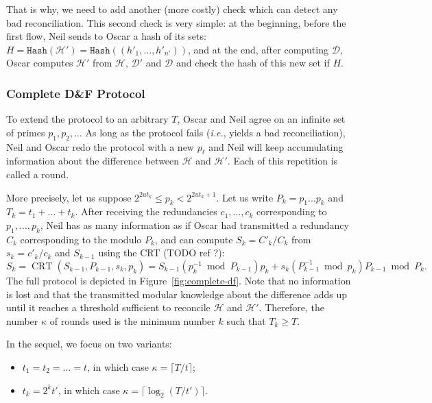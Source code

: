 \documentclass[11pt]{llncs}
\newcommand{\Set}{\mathcal{H}}
\newcommand{\SetD}{\mathcal{D}}
\newcommand{\df}{D\&F\xspace}
\newcommand{\ie}{\textit{i.e.}\xspace}
\newcommand{\Hash}{\ensuremath{\mathtt{Hash}}}
\DeclareMathOperator{\CRT}{CRT}
\begin{document}
That is why, we need to add another (more costly) check which can detect any bad reconciliation.
This second check is very simple: at the beginning, before the first flow, Neil sends to Oscar a hash of its sets: $H = \Hash(\Set') = \Hash((h'_1,\dots,h'_{n'}))$, and at the end, after computing $\SetD$, Oscar computes $\Set'$ from $\Set$, $\SetD'$ and $\SetD$ and check the hash of this new set if $H$.

\subsubsection{Complete \df Protocol}
\label{sec:complete-df}

To extend the protocol to an arbitrary $T$, Oscar and Neil agree on an infinite set of primes $p_1,p_2,\ldots$ As long as the protocol fails (\ie, yields a bad reconciliation), Neil and Oscar redo the protocol with a new $p_\ell$ and Neil will keep accumulating information about the difference between $\Set$ and $\Set'$. 
Each of this repetition is called a round.

More precisely, let us suppose $2^{2 u t_k} \le p_k < 2^{2 u t_k +1}$.
Let us write $P_k = p_1 \dots p_k$ and $T_k = t_1 + \dots + t_k$.
After receiving the redundancies $c_1,\dots,c_k$ corresponding to $p_1,\dots,p_k$, Neil has as many information as if Oscar had transmitted a redundancy $C_k$ corresponding to the modulo $P_k$, and can compute $S_k = C'_k / C_k$ from $s_k = c'_k/c_k$ and $S_{k-1}$ using the CRT (TODO ref ?): 
\[ S_k = \CRT(S_{k-1},P_{k-1},s_k,p_k) = S_{k-1} (p_k^{-1} \bmod P_{k-1}) p_k + s_k (P_{k-1}^{-1} \bmod p_k) P_{k-1} \bmod P_k. \]
The full protocol is depicted in Figure~\ref{fig:complete-df}.
Note that no information is lost and that the transmitted modular knowledge about the difference adds up until it reaches a threshold sufficient to reconcile $\Set$ and $\Set'$.
Therefore, the number $\kappa$ of rounds used is the minimum number $k$ such that $T_k \ge T$.

In the sequel, we focus on two variants:
\begin{itemize}
\item $t_1 = t_2 = \dots = t$, in which case $\kappa = \lceil T/t \rceil$;
\item $t_k = 2^k t'$, in which case $ \kappa = \lceil \log_2(T / t') \rceil $.
\end{itemize}
\end{document}
